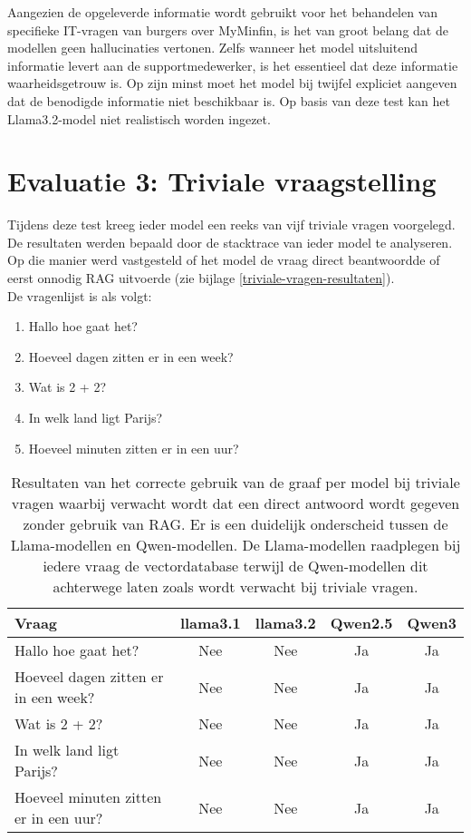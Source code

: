 Aangezien de opgeleverde informatie wordt gebruikt voor het behandelen van specifieke IT-vragen van burgers over MyMinfin, is het van groot belang dat de modellen geen hallucinaties vertonen. Zelfs wanneer het model uitsluitend informatie levert aan de supportmedewerker, is het essentieel dat deze informatie waarheidsgetrouw is. Op zijn minst moet het model bij twijfel expliciet aangeven dat de benodigde informatie niet beschikbaar is. Op basis van deze test kan het Llama3.2-model niet realistisch worden ingezet.

\section{Evaluatie 3: Triviale vraagstelling}

Tijdens deze test kreeg ieder model een reeks van vijf triviale vragen voorgelegd. De resultaten werden bepaald door de stacktrace van ieder model te analyseren. Op die manier werd vastgesteld of het model de vraag direct beantwoordde of eerst onnodig RAG uitvoerde (zie bijlage \ref{triviale-vragen-resultaten}).
\\[1em]
De vragenlijst is als volgt:

\begin{enumerate}
    \item Hallo hoe gaat het?
    \item Hoeveel dagen zitten er in een week?
    \item Wat is 2 + 2?
    \item In welk land ligt Parijs?
    \item Hoeveel minuten zitten er in een uur?
\end{enumerate}

\begin{table}[H]
    \centering
    \begin{tabular}{|l|c|c|c|c|}
        \hline
        \textbf{Vraag} & \textbf{llama3.1} & \textbf{llama3.2} & \textbf{Qwen2.5} & \textbf{Qwen3} \\
        \hline
        Hallo hoe gaat het? & Nee & Nee & Ja & Ja \\
        Hoeveel dagen zitten er in een week? & Nee & Nee & Ja & Ja \\
        Wat is 2 + 2? & Nee & Nee & Ja & Ja \\
        In welk land ligt Parijs? & Nee & Nee & Ja & Ja \\
        Hoeveel minuten zitten er in een uur? & Nee & Nee & Ja & Ja \\
        \hline
    \end{tabular}
    \caption{Resultaten van het correcte gebruik van de graaf per model bij triviale vragen waarbij verwacht wordt dat een direct antwoord wordt gegeven zonder gebruik van RAG. Er is een duidelijk onderscheid tussen de Llama-modellen en Qwen-modellen. De Llama-modellen raadplegen bij iedere vraag de vectordatabase terwijl de Qwen-modellen dit achterwege laten zoals wordt verwacht bij triviale vragen.}
    
\end{table}

